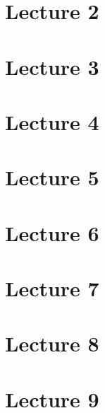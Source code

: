 \documentclass[a4paper,12pt,english]{article}
\begin{document}
\setcounter{section}{1}
\section{Lecture 2}

\section{Lecture 3}


\section{Lecture 4}

\section{Lecture 5}

\section{Lecture 6}


\section{Lecture 7}


\section{Lecture 8}


\section{Lecture 9}

\end{document}

